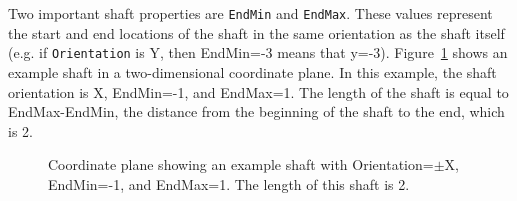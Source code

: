 \begin{doublespace}
Two important shaft properties are \texttt{EndMin} and \texttt{EndMax}. These values represent the start and end locations of the shaft in the same orientation as the shaft itself (e.g. if \texttt{Orientation} is Y, then EndMin=-3 means that y=-3). Figure~\ref{fig:shaft_length} shows an example shaft in a two-dimensional coordinate plane. In this example, the shaft orientation is X, EndMin=-1, and EndMax=1. The length of the shaft is equal to EndMax-EndMin, the distance from the beginning of the shaft to the end, which is 2.

\begin{figure}[htbp]
    \centering
    \caption{Coordinate plane showing an example shaft with Orientation=$\pm$X, EndMin=-1, and EndMax=1. The length of this shaft is 2.}
    \label{fig:shaft_length}
\end{figure}



\end{doublespace}
